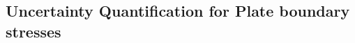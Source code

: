 \documentclass[12pt]{article}
\begin{document}



\subsection*{Uncertainty Quantification for Plate boundary stresses}
\end{document}
